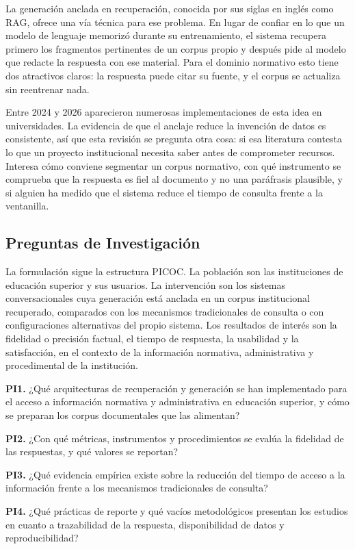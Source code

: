 \documentclass[man,12pt,floatsintext,donotrepeattitle]{apa7}
\begin{document}
La generación anclada en recuperación, conocida por sus siglas en inglés como RAG, ofrece una vía técnica para ese problema. En lugar de confiar en lo que un modelo de lenguaje memorizó durante su entrenamiento, el sistema recupera primero los fragmentos pertinentes de un corpus propio y después pide al modelo que redacte la respuesta con ese material. Para el dominio normativo esto tiene dos atractivos claros: la respuesta puede citar su fuente, y el corpus se actualiza sin reentrenar nada.

Entre 2024 y 2026 aparecieron numerosas implementaciones de esta idea en universidades. La evidencia de que el anclaje reduce la invención de datos es consistente, así que esta revisión se pregunta otra cosa: si esa literatura contesta lo que un proyecto institucional necesita saber antes de comprometer recursos. Interesa cómo conviene segmentar un corpus normativo, con qué instrumento se comprueba que la respuesta es fiel al documento y no una paráfrasis plausible, y si alguien ha medido que el sistema reduce el tiempo de consulta frente a la ventanilla.

\subsection{Preguntas de Investigación}
La formulación sigue la estructura PICOC. La población son las instituciones de educación superior y sus usuarios. La intervención son los sistemas conversacionales cuya generación está anclada en un corpus institucional recuperado, comparados con los mecanismos tradicionales de consulta o con configuraciones alternativas del propio sistema. Los resultados de interés son la fidelidad o precisión factual, el tiempo de respuesta, la usabilidad y la satisfacción, en el contexto de la información normativa, administrativa y procedimental de la institución.

\textbf{PI1.} ¿Qué arquitecturas de recuperación y generación se han implementado para el acceso a información normativa y administrativa en educación superior, y cómo se preparan los corpus documentales que las alimentan?

\textbf{PI2.} ¿Con qué métricas, instrumentos y procedimientos se evalúa la fidelidad de las respuestas, y qué valores se reportan?

\textbf{PI3.} ¿Qué evidencia empírica existe sobre la reducción del tiempo de acceso a la información frente a los mecanismos tradicionales de consulta?

\textbf{PI4.} ¿Qué prácticas de reporte y qué vacíos metodológicos presentan los estudios en cuanto a trazabilidad de la respuesta, disponibilidad de datos y reproducibilidad?
\end{document}

